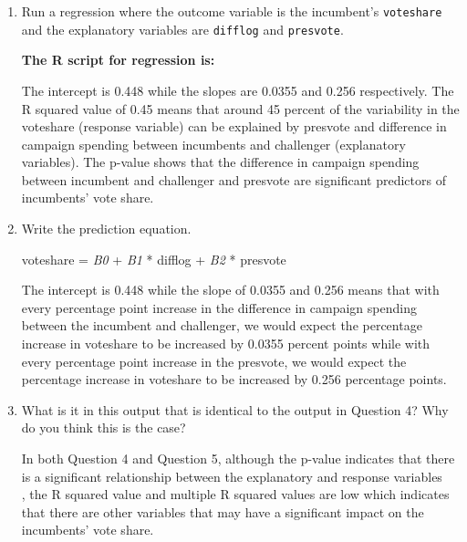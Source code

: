 \documentclass[12pt,letterpaper]{article}
\begin{document}
	\begin{enumerate}
		\item Run a regression where the outcome variable is the incumbent's \texttt{voteshare} and the explanatory variables are \texttt{difflog} and \texttt{presvote}.
	
	
		\textbf{		The R script for regression is:}
		 
	
	
		The intercept is 0.448 while the slopes are 0.0355 and 0.256 respectively. The R squared value of 0.45 means that around 45 percent of the variability in the voteshare (response variable) can be explained by presvote and difference in campaign spending between incumbents and challenger (explanatory variables). The p-value shows that the difference in campaign spending between incumbent and challenger and presvote are significant predictors of incumbents' vote share.
	
		\item Write the prediction equation.
	
	
		voteshare = \textit{B0} + \textit{B1} * difflog + \textit{B2} * presvote
	
		The intercept is 0.448 while the slope of 0.0355 and 0.256 means that with every percentage point increase in the difference in campaign spending between the incumbent and challenger, we would expect the percentage increase in voteshare to be increased by 0.0355 percent points while with every percentage point increase in the presvote, we would expect the percentage increase in voteshare to be increased by 0.256 percentage points.
	
	
		\item What is it in this output that is identical to the output in Question 4? Why do you think this is the case?
	
		In both Question 4 and Question 5, although the p-value indicates that there is a significant relationship between the explanatory and response variables\\
		, the R squared value and multiple R squared values are low which indicates that there are other variables that may have a significant impact on the incumbents' vote share.   
	
	\end{enumerate}
\end{document}
